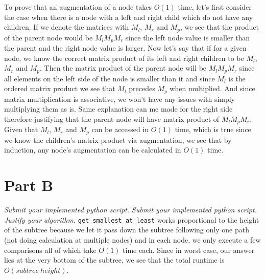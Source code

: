 \documentclass[12pt,twoside]{article}
\begin{document}
\begin{problems}
To prove that an augmentation of a node takes $O(1)$ time, let's first consider the case when there is a node with a left and right child which do not have any children. If we denote the matrices with $M_l$, $M_r$ and $M_p$, we see that the product of the parent node would be $M_l M_p M_r$ since the left node value is smaller than the parent and the right node value is larger. Now let's say that if for a given node, we know the correct matrix product of its left and right children to be $M_l$, $M_r$ and $M_p$. Then the matrix product of the parent node will be $M_l M_p M_r$ since all elements on the left side of the node is smaller than it and since $M_l$ is the ordered matrix product we see that $M_l$ precedes $M_p$ when multiplied. And since matrix multiplication is associative, we won't have any issues with simply multiplying them as is. Same explanation can me made for the right side therefore justifying that the parent node will have matrix product of $M_l M_p M_r$. Given that $M_l$, $M_r$ and $M_p$ can be accessed in $O(1)$ time, which is true since we know the children's matrix product via augmentation, we see that by induction, any node's augmentation can be calculated in $O(1)$ time.


\section*{Part B}
\problem  %
\begin{problemparts}
\problempart \emph{Submit your implemented python script.}  %
\problempart \emph{Submit your implemented python script.}  %
\problempart \emph{Justify your algorithm.}  %
{\tt get\_smallest\_at\_least} works proportional to the height of the subtree because we let it pass down the subtree following only one path (not doing calculation at multiple nodes) and in each node, we only execute a few comparisons all of which take $O(1)$ time each. Since in worst case, our answer lies at the very bottom of the subtree, we see that the total runtime is $O(subtree\ height)$. \\


\end{problemparts}
\end{problems}
\end{document}
